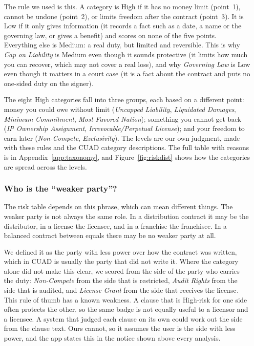 The rule we used is this. A category is High if it has no money limit (point~1), cannot be undone (point~2), or limits freedom after the contract (point~3). It is Low if it only gives information (it records a fact such as a date, a name or the governing law, or gives a benefit) and scores on none of the five points. Everything else is Medium: a real duty, but limited and reversible. This is why \emph{Cap on Liability} is Medium even though it sounds protective (it limits how much you can recover, which may not cover a real loss), and why \emph{Governing Law} is Low even though it matters in a court case (it is a fact about the contract and puts no one-sided duty on the signer).

The eight High categories fall into three groups, each based on a different point: money you could owe without limit (\emph{Uncapped Liability}, \emph{Liquidated Damages}, \emph{Minimum Commitment}, \emph{Most Favored Nation}); something you cannot get back (\emph{IP Ownership Assignment}, \emph{Irrevocable/Perpetual License}); and your freedom to earn later (\emph{Non-Compete}, \emph{Exclusivity}). The levels are our own judgment, made with these rules and the CUAD category descriptions. The full table with reasons is in Appendix~\ref{app:taxonomy}, and Figure~\ref{fig:riskdist} shows how the categories are spread across the levels.

\subsubsection{Who is the ``weaker party''?}
\label{sec:weaker}
The risk table depends on this phrase, which can mean different things. The weaker party is not always the same role. In a distribution contract it may be the distributor, in a license the licensee, and in a franchise the franchisee. In a balanced contract between equals there may be no weaker party at all.

We defined it as the party with less power over how the contract was written, which in CUAD is usually the party that did not write it. Where the category alone did not make this clear, we scored from the side of the party who carries the duty: \emph{Non-Compete} from the side that is restricted, \emph{Audit Rights} from the side that is audited, and \emph{License Grant} from the side that receives the license. This rule of thumb has a known weakness. A clause that is High-risk for one side often protects the other, so the same badge is not equally useful to a licensor and a licensee. A system that judged each clause on its own could work out the side from the clause text. Ours cannot, so it assumes the user is the side with less power, and the app states this in the notice shown above every analysis.

